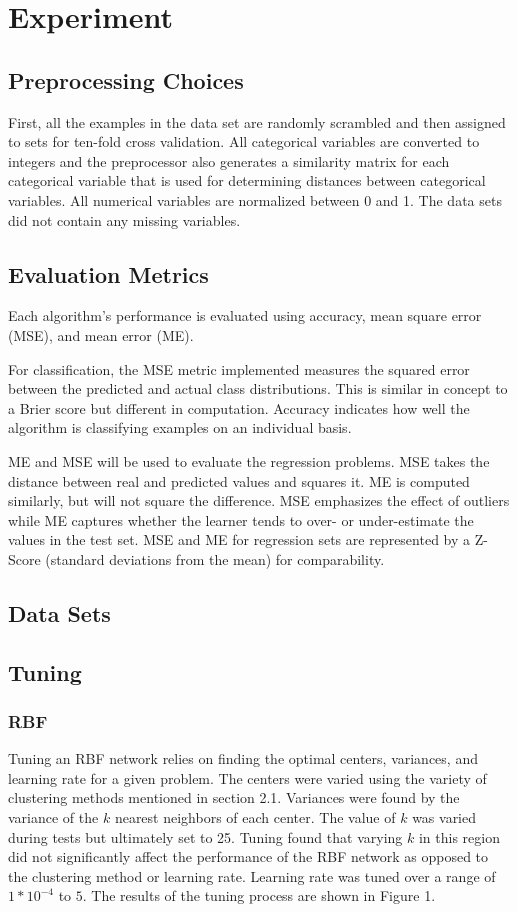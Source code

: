 \documentclass[twoside,11pt]{article}
\begin{document}
\section{Experiment}

\subsection{Preprocessing Choices}
First, all the examples in the data set are randomly scrambled and then assigned to sets
for ten-fold cross validation. All categorical variables are converted to integers and the
preprocessor also generates a similarity matrix for each categorical variable that is used for
determining distances between categorical variables. All numerical variables are normalized
between 0 and 1. The data sets did not contain any missing variables.

\subsection{Evaluation Metrics}
Each algorithm's performance is evaluated using accuracy, mean square error (MSE), and mean error (ME).

For classification, the MSE metric implemented measures the squared error between the predicted and actual class distributions. This is similar in concept to a Brier score but different in computation.  Accuracy indicates how well the algorithm is classifying examples on an individual basis.

ME and MSE will be used to evaluate the regression problems. MSE takes the distance between real and predicted values and squares it. ME is computed similarly, but will not square the difference. MSE emphasizes the effect of outliers while ME captures whether the learner tends to over- or under-estimate the values in the test set. MSE and ME for regression sets are represented by a Z-Score (standard deviations from the mean) for comparability.
\subsection{Data Sets}
\subsection{Tuning}
\subsubsection{RBF}
Tuning an RBF network relies on finding the optimal centers, variances, and learning rate for a given problem. The centers were varied using the variety of clustering methods mentioned in section 2.1. Variances were found by the variance of the $k$ nearest neighbors of each center. The value of $k$ was varied during tests but ultimately set to 25. Tuning found that varying $k$ in this region did not significantly affect the performance of the RBF network as opposed to the clustering method or learning rate. Learning rate was tuned over a range of $1*10^{-4}$ to $5$. The results of the tuning process are shown in Figure 1. %
\end{document}
